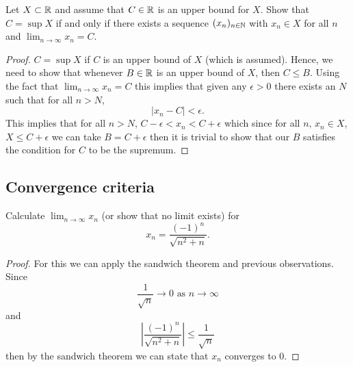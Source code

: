 \documentclass[10pt, a4paper]{article}
\newcommand{\limas}[3][n]{#2 \rightarrow #3 \text{ as } #1 \rightarrow \infty}
\begin{document}
\begin{example}
    Let $X \subset \mathbb{R}$ and assume that $C \in \mathbb{R}$ is an upper bound for $X$. Show that $C = \sup X$ if and only if there exists a sequence $(x_n)_{n\in\mathbb{N}}$ with $x_n\in X$ for all $n$ and $\lim_{n\rightarrow\infty} x_n = C$.
    \begin{proof}
        $C = \sup X$ if $C$ is an upper bound of $X$ (which is assumed). Hence, we need to show that whenever $B \in \mathbb{R}$ is an upper bound of $X$, then $C \leq B$. Using the fact that $\lim_{n\rightarrow\infty} x_n = C$ this implies that given any $\epsilon > 0$ there exists an $N$ such that for all $n > N$,
        \[
        |x_n - C| < \epsilon.
        \]
        This implies that for all $n > N$, $C - \epsilon < x_n < C + \epsilon$ which since for all $n,\, x_n \in X$, $X \leq C + \epsilon$ we can take $B = C + \epsilon$ then it is trivial to show that our $B$ satisfies the condition for $C$ to be the supremum.
    \end{proof}
\end{example}

\subsection{Convergence criteria}

\begin{example}
    Calculate $\lim_{n \rightarrow \infty} x_n$ (or show that no limit exists) for 
    \[
    x_n = \frac{(-1) ^ n}{\sqrt{n ^ 2 + n}}.
    \]
    \begin{proof}
        For this we can apply the sandwich theorem and previous observations. \\
        Since 
        \[
        \limas{\frac{1}{\sqrt{n}}}{0}
        \]
        and
        \[
        \left|\frac{(-1) ^ n}{\sqrt{n ^ 2 + n}}\right| \leq \frac{1}{\sqrt{n}}
        \]
        then by the sandwich theorem we can state that $x_n$ converges to $0$.
    \end{proof}
\end{example}
\end{document}
